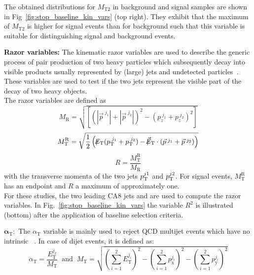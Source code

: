 \begin{description}
The obtained distributions for $M_\mathrm{T2}$ in background and signal samples are shown in Fig~\ref{fig:stop_baseline_kin_vars} (top right). They exhibit that the maximum of $M_\mathrm{T2}$ is higher for signal events than for background such that this variable is suitable for distinguishing signal and background events.  
 \item \textbf{Razor variables:} The kinematic razor variables are used to describe the generic process of pair production of two heavy particles which subsequently decay into visible products usually represented by (large) jets and undetected particles~\cite{Chatrchyan:2012uea, Chatrchyan:2014goa, CMS-PAS-SUS-14-011}. These variables are used to test if the two jets represent the visible part of the decay of two heavy objects. \\
The razor variables are defined as
\begin{equation}
M_\mathrm{R} = \sqrt{\left[(|\vec{p}^{\; j_1} | + |\vec{p}^{\; j_2} |)^2 - (p_z^{\; j_1}  + p_z^{\; j_2} )^2 \right]}
\end{equation}
 \begin{equation}
M_\mathrm{T}^\mathrm{R} = \sqrt{\frac{1}{2} \left( \slash\mkern-12mu{E}_{\text{T}} (p_{\text{T}}^{\; j_1}  + p_{\text{T}}^{\; j_2} ) - \slash\mkern-12mu{\vec{E}}_{\text{T}} \cdot (\vec{p}^{\; j_1} + \vec{p}^{\; j_2}) \right) }
\end{equation}
\begin{equation}
R = \frac{M_\mathrm{T}^\mathrm{R}}{M_\mathrm{R}}
\end{equation}
with the transverse momenta of the two jets $p_{\text{T}}^{j1}$ and $p_{\text{T}}^{j2}$. For signal events, $M_\mathrm{T}^\mathrm{R}$ has an endpoint and $R$ a maximum of approximately one. \\
For these studies, the two leading CA8 jets and \met are used to compute the razor variables. In Fig.~\ref{fig:stop_baseline_kin_vars} the variable $R^2$ is illustrated (bottom) after the application of baseline selection criteria. 
\item $\mathbf{\alpha_\mathrm{T}:}$ The $\alpha_\mathrm{T}$ variable is mainly used to reject QCD multijet events which have no intrinsic \met~\cite{Chatrchyan:2012wa, Chatrchyan:2013lya}. In case of dijet events, it is defined as:
\begin{equation}
 \alpha_\mathrm{T} = \frac{E_\mathrm{T}^{j_2}}{M_\mathrm{T}} \;\; \mathrm{and} \;\; M_\mathrm{T} = \sqrt{\left( \sum_{i=1}^{2} E_\mathrm{T}^{j_i} \right)^2 - \left( \sum_{i=1}^{2} p_\mathrm{x}^{j_i} \right)^2 - \left( \sum_{i=1}^{2} p_\mathrm{y}^{j_i} \right)^2}
\end{equation}

\end{description}
